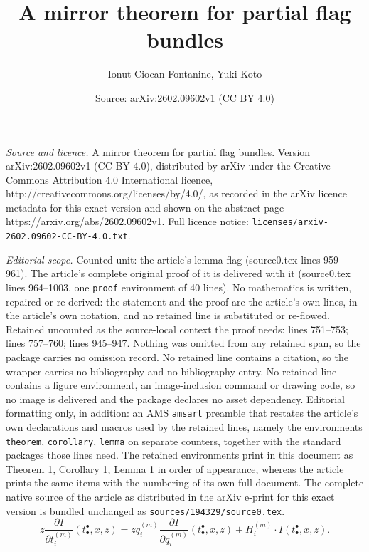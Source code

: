 \documentclass[10pt,a4paper]{amsart}
\title{A mirror theorem for partial flag bundles}
\author{Ionut Ciocan-Fontanine, Yuki Koto}
\date{Source: arXiv:2602.09602v1 (CC BY 4.0)}
\def\parfrac#1#2{\frac{\partial #1}{\partial #2}}
\begin{document}
\maketitle

\noindent\emph{Source and licence.} A mirror theorem for partial flag bundles. Version arXiv:2602.09602v1 (CC BY 4.0), distributed by arXiv under the Creative Commons Attribution 4.0 International licence, http://creativecommons.org/licenses/by/4.0/, as recorded in the arXiv licence metadata for this exact version and shown on the abstract page https://arxiv.org/abs/2602.09602v1. Full licence notice: \texttt{licenses/arxiv-2602.09602-CC-BY-4.0.txt}.\par\smallskip

\noindent\textit{Editorial scope.} Counted unit: the article's lemma flag (source0.tex lines 959--961). The article's complete original proof of it is delivered with it (source0.tex lines 964--1003, one \texttt{proof} environment of 40 lines). No mathematics is written, repaired or re-derived: the statement and the proof are the article's own lines, in the article's own notation, and no retained line is substituted or re-flowed.  Retained uncounted as the source-local context the proof needs: lines 751--753; lines 757--760; lines 945--947.  Nothing was omitted from any retained span, so the package carries no omission record.  No retained line contains a citation, so the wrapper carries no bibliography and no bibliography entry.  No retained line contains a figure environment, an image-inclusion command or drawing code, so no image is delivered and the package declares no asset dependency.  Editorial formatting only, in addition: an AMS \texttt{amsart} preamble that restates the article's own declarations and macros used by the retained lines, namely the environments \texttt{theorem}, \texttt{corollary}, \texttt{lemma} on separate counters, together with the standard packages those lines need.  The retained environments print in this document as Theorem 1, Corollary 1, Lemma 1 in order of appearance, whereas the article prints the same items with the numbering of its own full document.  The complete native source of the article as distributed in the arXiv e-print for this exact version is bundled unchanged as \texttt{sources/194329/source0.tex}.
\begin{equation}\label{eqn:Divisor_Equation}
    z\parfrac{I}{t_i^{(m)}}(t_\bullet^\bullet,x,z) = zq_i^{(m)}\parfrac{I}{q_i^{(m)}}(t_\bullet^\bullet,x,z) + H_i^{(m)}\cdot I(t_\bullet^\bullet,x,z).
\end{equation}
\end{document}
